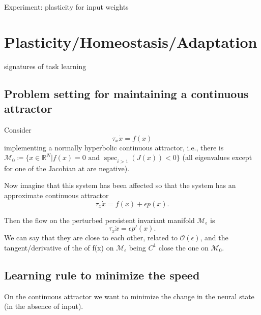 \documentclass{article}
\theoremstyle{definition} \newtheorem{definition}{Definition}
\theoremstyle{remark} \newtheorem{remark}{Remark}
\newcommand{\reals}{\mathbb{R}}
\newcommand{\manifold}{\mathcal{M}}
\newcommand{\spec}{\operatorname{spec}}
\newcounter{ct}
\begin{document}
Experiment: plasticity for input weights





\section{Plasticity/Homeostasis/Adaptation}
\citep{martin2000plasticity}
\citep{takeuchi2014plasticity}

\cite{bell2024discovering} \citep{shervani2023meta}
\citep{chadwick2023learning}

signatures of task learning \citep{gurnani2023task}

\subsection{Problem setting for maintaining a continuous attractor}

Consider 
\begin{equation}\label{eq:ode}
\tau_x\dot x = f(x) 
\end{equation}
implementing a normally hyperbolic continuous attractor, i.e., there is $\manifold_0\coloneqq \{x \in \reals^N | f(x) = 0 \text{ and } \spec_{i>1}(J(x)) <0\}$  (all eigenvalues except for one of the Jacobian at are negative). 

Now imagine that this system has been affected so that the system has an approximate continuous attractor
\begin{equation}\label{eq:ode_pert}
\tau_x\dot x = f(x)  + \epsilon p(x).
\end{equation}

Then the flow on the perturbed persistent invariant manifold $\manifold_\epsilon$ is
\begin{equation}\label{eq:ode_pert}
\tau_x\dot x = \epsilon p'(x).
\end{equation}
We can say that they are close to each other, related to $\mathcal{O}(\epsilon)$, and the tangent/derivative of the of f(x) on $\manifold_\epsilon$ being $C^1$ close the one on $\manifold_0$.




\subsection{Learning rule to minimize the speed}%
On the continuous attractor we want to minimize the change in the neural state (in the absence of input).
\end{document}
